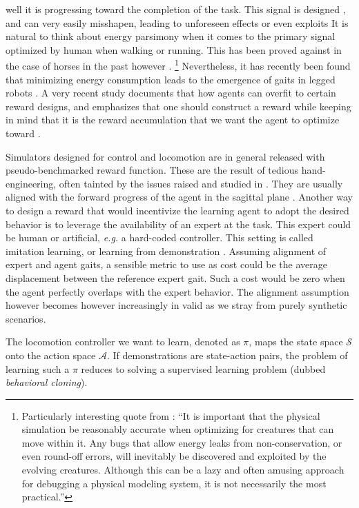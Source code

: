 \documentclass[12pt,a4paper]{article}
\begin{document}
well it is progressing toward the completion of the task.
This signal is designed \cite{Singh2009-cm, Randlov1998-qo, Russell1998-yk, Sims1994-zb},
and can very easily misshapen, leading to unforeseen effects or even exploits
\cite{Amodei2016-vg, Everitt2017-ql, Pan2022-ja, Langosco2022-eo, Skalse2022-xe, Sims1994-zb}
It is natural to think about energy parsimony when it comes to the primary signal optimized by
human when walking or running. This has been proved against in the case of horses in the past
however \cite{Hoyt1981-ma, Farley1991-fd}.
\footnote{Particularly interesting quote from \cite{Sims1994-zb}:
``It is important that the physical simulation be reasonably accurate when optimizing
for creatures that can move within it. Any bugs that allow energy leaks from non-conservation,
or even round-off errors, will inevitably be discovered and exploited by the evolving
creatures. Although this can be a lazy and often amusing approach for debugging a physical
modeling system, it is not necessarily the most practical.''}
Nevertheless, it has recently been found that minimizing energy consumption leads
to the emergence of gaits in legged robots \cite{Fu2021-hk}.
A very recent study documents that how agents can overfit to certain reward designs,
and emphasizes that one should construct a reward while keeping in mind that it is the 
reward accumulation that we want the agent to optimize toward \cite{Booth2023-ua}.

Simulators designed for control and locomotion are in general released with pseudo-benchmarked
reward function. These are the result of tedious hand-engineering, often tainted by the issues
raised and studied in \cite{Booth2023-ua}. They are usually aligned with the forward progress
of the agent in the sagittal plane \cite{Schulman2015-jt}. Another way to design a reward that
would incentivize the learning agent to adopt the desired behavior is to leverage the availability
of an expert at the task. This expert could be human or artificial, \textit{e.g.} a hard-coded
controller. This setting is called imitation learning, or learning from demonstration
\cite{Billard2008-jb, Atkeson1997-db, Bagnell2015-ni}.
Assuming alignment of expert and agent gaits, a sensible metric to use as cost could be the
average displacement between the reference expert gait.
Such a cost would be zero when the agent perfectly overlaps with the expert behavior.
The alignment assumption however becomes however increasingly in valid as we stray from purely
synthetic scenarios.

The locomotion controller we want to learn, denoted as $\pi$, maps the state space $\mathcal{S}$
onto the action space $\mathcal{A}$.
If demonstrations are state-action pairs, the problem of learning such a $\pi$ reduces to solving
a supervised learning problem (dubbed \textit{behavioral cloning}).
\end{document}
